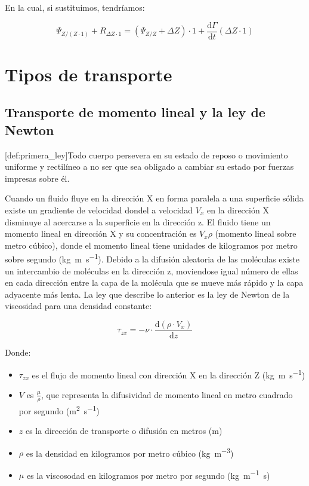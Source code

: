 \documentclass{AsignaturaResumen}
\begin{document}
En la cual, si sustituimos, tendríamos:

\begin{equation}
    \Psi_{Z / (Z \cdot 1)} + R_{\Delta Z \cdot 1} = (\Psi_{Z/Z} + \Delta Z) \cdot 1 + \frac{\mathrm{d}\Gamma}{\mathrm{d}t} (\Delta Z \cdot 1)
\end{equation}


\section{Tipos de transporte}

\subsection{Transporte de momento lineal y la ley de Newton}

[def:primera_ley]{Todo cuerpo persevera en su estado de reposo o movimiento uniforme y rectilíneo a no ser que sea obligado a cambiar su estado por fuerzas impresas sobre él.}

Cuando un fluido fluye en la dirección X en forma paralela a una superficie sólida existe un gradiente de velocidad dondel a velocidad $V_{x}$ en la dirección X disminuye al acercarse a la superficie en la dirección z. El fluido tiene un momento lineal en dirección X y su concentración es $V_{x}\rho$ (momento lineal sobre metro cúbico), donde el momento lineal tiene unidades de kilogramos por metro sobre segundo (\unit{\kg\m\per\s}). Debido a la difusión aleatoria de las moléculas existe un intercambio de moléculas en la dirección z, moviendose igual número de ellas en cada dirección entre la capa de la molécula que se mueve más rápido y la capa adyacente más lenta. La ley que describe lo anterior es la ley de Newton de la viscosidad para una densidad constante:

\begin{equation}
    \tau_{zx} = -\nu \cdot \frac{\mathrm{d}(\rho \cdot V_{x})}{\mathrm{d}z}
\end{equation}

Donde:

\begin{itemize}
    \item $\tau_{zx}$ es el flujo de momento lineal con dirección X en la dirección Z (\unit{\kg\m\per\s})
    \item $V$ es $\frac{\mu}{\rho}$, que representa la difusividad de momento lineal en metro cuadrado por segundo (\unit{\m\squared\per\s})
    \item $z$ es la dirección de transporte o difusión en metros (\unit{\m})
    \item $\rho$ es la densidad en kilogramos por metro cúbico (\unit{\kg\per\m\cubed})
    \item $\mu$ es la viscosodad en kilogramos por metro por segundo (\unit{\kg\per\m\s})
\end{itemize}
\end{document}
